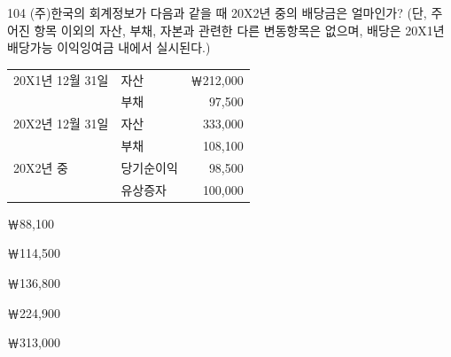 \begin{question}{104}
(주)한국의 회계정보가 다음과 같을 때 20X2년 중의 배당금은 얼마인가? (단, 주어진 항목 이외의 자산, 부채, 자본과 관련한 다른 변동항목은 없으며, 배당은 20X1년 배당가능 이익잉여금 내에서 실시된다.)

{\small\centering
\begin{tabular}{llr}
\hline
20X1년 12월 31일 & 자산 & ￦212,000 \\
 & 부채 & 97,500 \\
20X2년 12월 31일 & 자산 & 333,000 \\
 & 부채 & 108,100 \\
20X2년 중 & 당기순이익 & 98,500 \\
 & 유상증자 & 100,000 \\
\hline
\end{tabular}
\par}

\begin{choices}
  \item ￦88,100
  \item ￦114,500
  \item ￦136,800
  \item ￦224,900
  \item ￦313,000
\end{choices}
\end{question}
